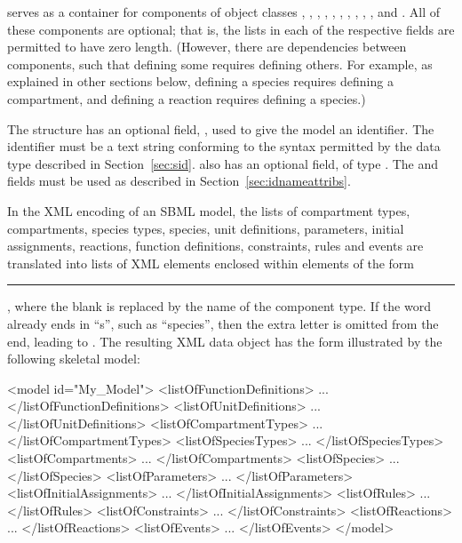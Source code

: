 \Model serves as a container for components of object classes
\FunctionDefinition, \UnitDefinition, \CompartmentType,
\SpeciesType, \Compartment, \Species, \Parameter,
\InitialAssignment, \Rule, \Constraint, \Reaction and \Event. All
of these components are optional; that is, the lists in each of
the respective fields are permitted to have zero length. (However,
there are dependencies between components, such that defining some
requires defining others.  For example, as explained in other
sections below, defining a species requires defining a
compartment, and defining a reaction requires defining a species.)

The \Model structure has an optional field, , used to
give the model an identifier.  The identifier must be a text
string conforming to the syntax permitted by the 
data type described in Section~\ref{sec:sid}.  \Model also has an
optional  field, of type .  The
 and  fields must be used as described in
Section~\ref{sec:idnameattribs}.

In the XML encoding of an SBML model, the lists of compartment
types, compartments, species types, species, unit definitions,
parameters, initial assignments, reactions, function definitions,
constraints, rules and events are translated into lists of XML
elements enclosed within elements of the form
\rule{0.5in}{0.5pt}, where the blank is
replaced by the name of the component type.  If the word already
ends in ``s'', such as ``species'', then the extra letter is
omitted from the end, leading to .  The
resulting XML data object has the form illustrated by the
following skeletal model:
\begin{example}
<model id="My_Model">
    <listOfFunctionDefinitions>
        ...
    </listOfFunctionDefinitions>
    <listOfUnitDefinitions>
        ...
    </listOfUnitDefinitions>
    <listOfCompartmentTypes>
        ...
    </listOfCompartmentTypes>
    <listOfSpeciesTypes>
        ...
    </listOfSpeciesTypes>
    <listOfCompartments>
        ...
    </listOfCompartments>
    <listOfSpecies>
        ...
    </listOfSpecies>
    <listOfParameters>
        ...
    </listOfParameters>
    <listOfInitialAssignments>
        ...
    </listOfInitialAssignments>
    <listOfRules>
        ...
    </listOfRules>
    <listOfConstraints>
        ...
    </listOfConstraints>
    <listOfReactions>
        ...
    </listOfReactions>
    <listOfEvents>
        ...
    </listOfEvents>
</model>
\end{example}

